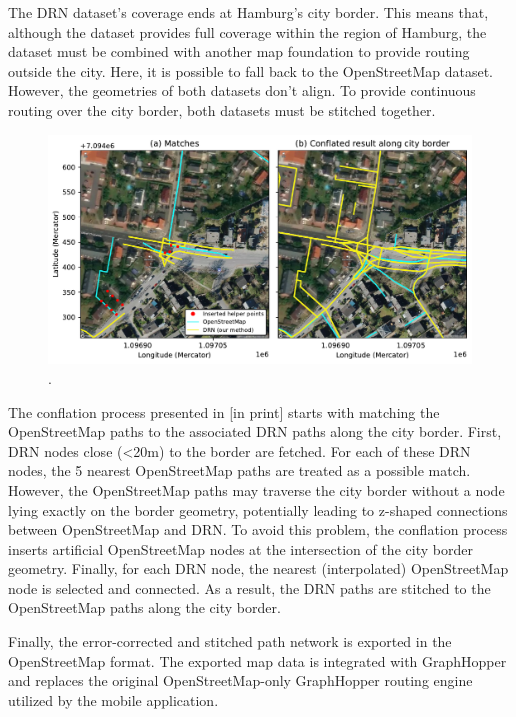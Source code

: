 The DRN dataset's coverage ends at Hamburg's city border. This means that, although the dataset provides full coverage within the region of Hamburg, the dataset must be combined with another map foundation to provide routing outside the city. Here, it is possible to fall back to the OpenStreetMap dataset. However, the geometries of both datasets don't align. To provide continuous routing over the city border, both datasets must be stitched together. 

\begin{figure}[htbp]
\centering
\includegraphics[width=\linewidth]{images/routing-drn-osm-border.pdf}
\caption{.}
\label{fig:}
\end{figure}

The conflation process presented in [in print] starts with matching the OpenStreetMap paths to the associated DRN paths along the city border. First, DRN nodes close (<20m) to the border are fetched. For each of these DRN nodes, the 5 nearest OpenStreetMap paths are treated as a possible match. However, the OpenStreetMap paths may traverse the city border without a node lying exactly on the border geometry, potentially leading to z-shaped connections between OpenStreetMap and DRN. To avoid this problem, the conflation process inserts artificial OpenStreetMap nodes at the intersection of the city border geometry. Finally, for each DRN node, the nearest (interpolated) OpenStreetMap node is selected and connected. As a result, the DRN paths are stitched to the OpenStreetMap paths along the city border.

Finally, the error-corrected and stitched path network is exported in the OpenStreetMap format. The exported map data is integrated with GraphHopper and replaces the original OpenStreetMap-only GraphHopper routing engine utilized by the mobile application.

